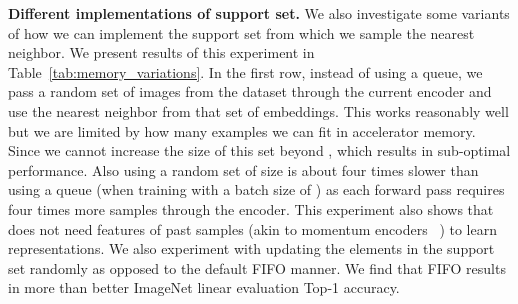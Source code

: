 \noindent \textbf{Different implementations of support set.}
We also investigate some variants of how we can implement the support set from which we sample the nearest neighbor. We present results of this experiment in Table~\ref{tab:memory_variations}. In the first row, instead of using a queue, we pass a random set of images from the dataset through the current encoder and use the nearest neighbor from that set of embeddings. This works reasonably well but we are limited by how many examples we can fit in accelerator memory. Since we cannot increase the size of this set beyond , which results in sub-optimal performance. 
Also using a random set of size  is about four times slower than using a queue (when training with a batch size of ) as each forward pass requires four times more samples through the encoder. This experiment also shows that \methodname does not need features of past samples (akin to momentum encoders ~\cite{he2020momentum}) to learn representations. We also experiment with updating the elements in the support set randomly as opposed to the default FIFO manner. We find that FIFO results in more than  better ImageNet linear evaluation Top-1 accuracy.


